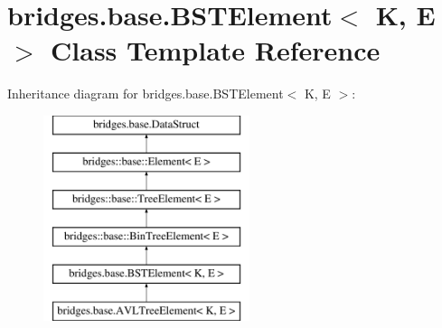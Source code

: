 \hypertarget{classbridges_1_1base_1_1_b_s_t_element}{}\section{bridges.\+base.\+B\+S\+T\+Element$<$ K, E $>$ Class Template Reference}
\label{classbridges_1_1base_1_1_b_s_t_element}
Inheritance diagram for bridges.\+base.\+B\+S\+T\+Element$<$ K, E $>$\+:\begin{figure}[H]
\begin{center}
\leavevmode
\includegraphics[height=6.000000cm]{classbridges_1_1base_1_1_b_s_t_element}
\end{center}
\end{figure}
